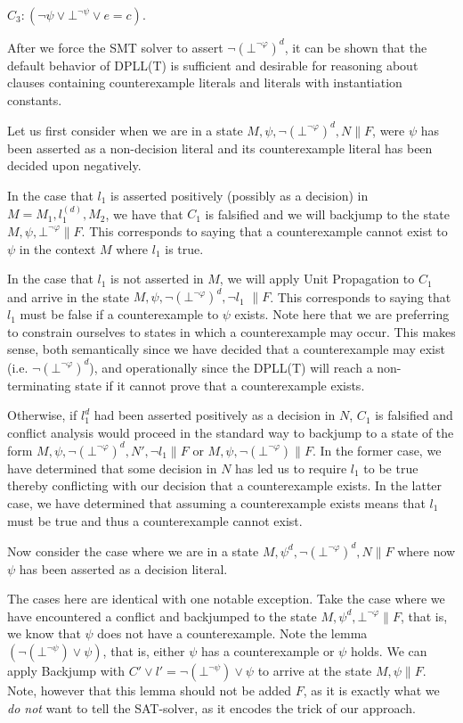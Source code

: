 \documentclass{llncs}
\begin{document}
$C_3 : ( \neg \psi \vee \bot^{\neg \psi} \vee e = c )$.

After we force the SMT solver to assert $\neg( \bot^{\neg \varphi} )^d$, it can be shown that the default behavior of DPLL(T) is sufficient and desirable for reasoning about clauses containing counterexample literals and literals with instantiation constants.

Let us first consider when we are in a state $M, \psi, \neg( \bot^{\neg \varphi} )^d, N \parallel F$, were $\psi$ has been asserted as a non-decision literal and its counterexample literal has been decided upon negatively.

In the case that $l_1$ is asserted positively (possibly as a decision) in $M = M_1, l^{(d)}_1, M_2$, we have that $C_1$ is falsified and we will backjump to the state $M, \psi, \bot^{\neg \varphi} \parallel F$.
This corresponds to saying that a counterexample cannot exist to $\psi$ in the context $M$ where $l_1$ is true.

In the case that $l_1$ is not asserted in $M$, we will apply Unit Propagation to $C_1$ and arrive in the state $M, \psi, \neg( \bot^{\neg \varphi} )^d, \neg l_1$ $\parallel F$.
This corresponds to saying that $l_1$ must be false if a counterexample to $\psi$ exists.
Note here that we are preferring to constrain ourselves to states in which a counterexample may occur.
This makes sense, both semantically since we have decided that a counterexample may exist (i.e. $\neg( \bot^{\neg \varphi} )^d$), and operationally since the DPLL(T) will reach a non-terminating state if it cannot prove that a counterexample exists.

Otherwise, if $l_1^d$ had been asserted positively as a decision in $N$, $C_1$ is falsified and conflict analysis would proceed in the standard way to backjump to a state of the form $M, \psi, \neg( \bot^{\neg \varphi} )^d, N', \neg l_1 \parallel F$ or $M, \psi, \neg( \bot^{\neg \varphi} )  \parallel F$.
In the former case, we have determined that some decision in $N$ has led us to require $l_1$ to be true thereby conflicting with our decision that a counterexample exists.
In the latter case, we have determined that assuming a counterexample exists means that $l_1$ must be true and thus a counterexample cannot exist.

Now consider the case where we are in a state $M, \psi^d, \neg( \bot^{\neg \varphi} )^d, N  \parallel F$ where now $\psi$ has been asserted as a decision literal.

The cases here are identical with one notable exception.
Take the case where we have encountered a conflict and backjumped to the state $M, \psi^d, \bot^{\neg \varphi} \parallel F$, that is, we know that $\psi$ does not have a counterexample.
Note the lemma $(\neg (\bot^{\neg \psi}) \vee \psi)$, that is, either $\psi$ has a counterexample or $\psi$ holds.
We can apply Backjump with $C' \vee l' = \neg (\bot^{\neg \psi}) \vee \psi$ to arrive at the state $M, \psi \parallel F$.
Note, however that this lemma should not be added $F$, as it is exactly what we \emph{do not} want to tell the SAT-solver, as it encodes the trick of our approach.
\end{document}
